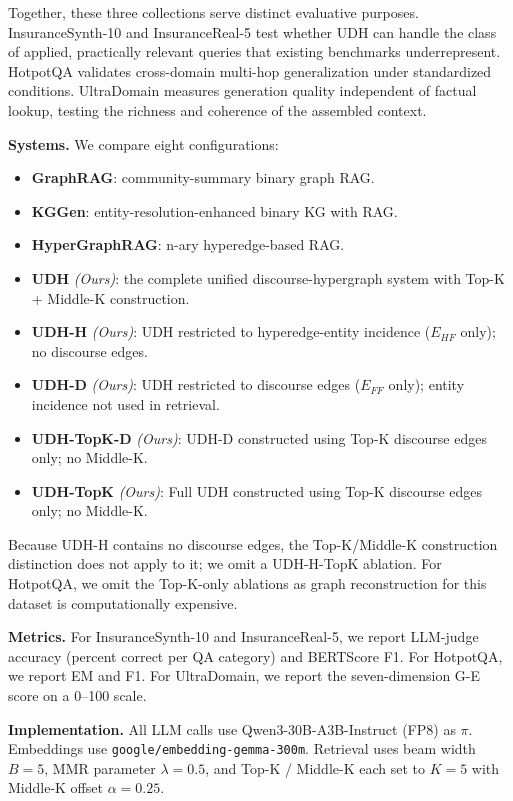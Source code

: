 \documentclass[runningheads]{llncs}
\begin{document}
Together, these three collections serve distinct evaluative purposes. InsuranceSynth-10 and InsuranceReal-5 test whether UDH can handle the class of applied, practically relevant queries that existing benchmarks underrepresent. HotpotQA validates cross-domain multi-hop generalization under standardized conditions. UltraDomain measures generation quality independent of factual lookup, testing the richness and coherence of the assembled context.

\textbf{Systems.} We compare eight configurations:

\begin{itemize}
    \item \textbf{GraphRAG}: community-summary binary graph RAG.
    \item \textbf{KGGen}: entity-resolution-enhanced binary KG with RAG.
    \item \textbf{HyperGraphRAG}: n-ary hyperedge-based RAG.
    \item \textbf{UDH} \textit{(Ours)}: the complete unified discourse-hypergraph system with Top-K + Middle-K construction.
    \item \textbf{UDH-H} \textit{(Ours)}: UDH restricted to hyperedge-entity incidence ($E_{HF}$ only); no discourse edges.
    \item \textbf{UDH-D} \textit{(Ours)}: UDH restricted to discourse edges ($E_{FF}$ only); entity incidence not used in retrieval.
    \item \textbf{UDH-TopK-D} \textit{(Ours)}: UDH-D constructed using Top-K discourse edges only; no Middle-K.
    \item \textbf{UDH-TopK} \textit{(Ours)}: Full UDH constructed using Top-K discourse edges only; no Middle-K.
\end{itemize}

Because UDH-H contains no discourse edges, the Top-K/Middle-K construction distinction does not apply to it; we omit a UDH-H-TopK ablation. For HotpotQA, we omit the Top-K-only ablations as graph reconstruction for this dataset is computationally expensive.

\textbf{Metrics.} For InsuranceSynth-10 and InsuranceReal-5, we report LLM-judge accuracy (percent correct per QA category) and BERTScore F1. For HotpotQA, we report EM and F1. For UltraDomain, we report the seven-dimension G-E score on a 0--100 scale.

\textbf{Implementation.} All LLM calls use Qwen3-30B-A3B-Instruct (FP8) as $\pi$. Embeddings use \texttt{google/embedding-gemma-300m}. Retrieval uses beam width $B = 5$, MMR parameter $\lambda = 0.5$, and Top-K / Middle-K each set to $K = 5$ with Middle-K offset $\alpha = 0.25$.
\end{document}
